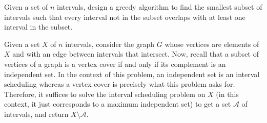 \begin{exercise}
	Given a set of $n$ intervals, design a greedy algorithm to find the smallest subset of intervals such that every interval not in the subset overlaps with at least one interval in the subset.
\end{exercise}
\begin{solution*}
	Given a set $X$ of $n$ intervals, consider the graph $G$ whose vertices are elements of $X$ and with an edge between intervals that intersect. Now, recall that a subset of vertices of a graph is a vertex cover if and only if its complement is an independent set. In the context of this problem, an independent set is an interval scheduling whereas a vertex cover is precisely what this problem asks for. Therefore, it suffices to solve the interval scheduling problem on $X$ (in this context, it just corresponds to a maximum independent set) to get a set $\mathcal{A}$ of intervals, and return $X\setminus\mathcal{A}$.
\end{solution*}

